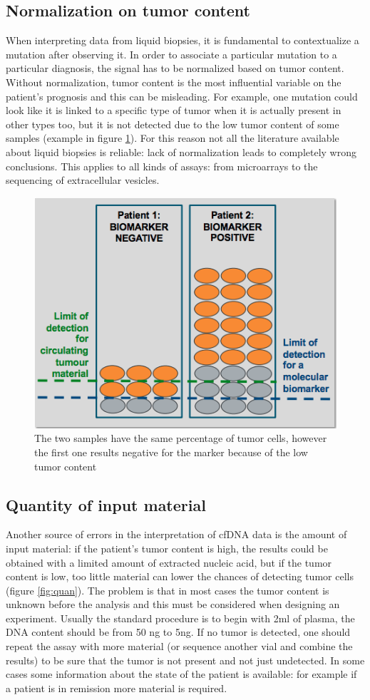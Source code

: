 \subsection{Normalization on tumor content}
When interpreting data from liquid biopsies, it is fundamental to contextualize a mutation after observing it.
In order to associate a particular mutation to a particular diagnosis, the signal has to be normalized based on tumor content.
Without normalization, tumor content is the most influential variable on the patient's prognosis and this can be misleading.
For example, one mutation could look like it is linked to a specific type of tumor when it is actually present in other types too, but it is not detected due to the low tumor content of some samples (example in figure \ref{fig:norm}).
For this reason not all the literature available about liquid biopsies is reliable: lack of normalization leads to completely wrong conclusions. This applies to all kinds of assays: from microarrays to the sequencing of extracellular vesicles. \\

\begin{figure}[H]
\centering
    \includegraphics[width=0.4\linewidth]{norm.png}
    \caption{The two samples have the same percentage of tumor cells, however the first one results negative for the marker because of the low tumor content}
    \label{fig:norm}
\end{figure}

\subsection{Quantity of input material}
Another source of errors in the interpretation of cfDNA data is the amount of input material: if the patient's tumor content is high, the results could be obtained with a limited amount of extracted nucleic acid, but if the tumor content is low, too little material can lower the chances of detecting tumor cells (figure \ref{fig:quan}).
The problem is that in most cases the tumor content is unknown before the analysis and this must be considered when designing an experiment.
Usually the standard procedure is to begin with 2ml of plasma, the DNA content should be from 50 ng to 5ng.
If no tumor is detected, one should repeat the assay with more material (or sequence another vial and combine the results) to be sure that the tumor is not present and not just undetected.
In some cases some information about the state of the patient is available: for example if a patient is in remission more material is required.

